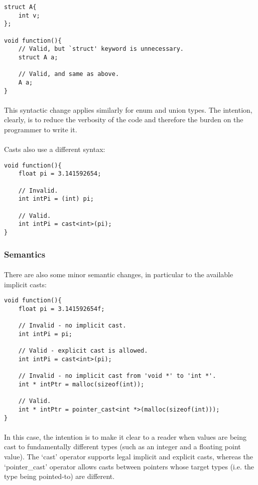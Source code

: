 \documentclass[12pt,twoside,notitlepage]{report}
\begin{document}
\begin{lstlisting}
struct A{
	int v;
};

void function(){
	// Valid, but `struct' keyword is unnecessary.
	struct A a;
	
	// Valid, and same as above.
	A a;
}
\end{lstlisting}

\paragraph{}
This syntactic change applies similarly for enum and union types. The intention, clearly, is to reduce the verbosity of the code and therefore the burden on the programmer to write it.

\paragraph{}
Casts also use a different syntax:


\begin{lstlisting}
void function(){
	float pi = 3.141592654;
	
	// Invalid.
	int intPi = (int) pi;
	
	// Valid.
	int intPi = cast<int>(pi);
}
\end{lstlisting}


\subsubsection{Semantics}

\paragraph{}
There are also some minor semantic changes, in particular to the available implicit casts:


\begin{lstlisting}
void function(){
	float pi = 3.141592654f;
	
	// Invalid - no implicit cast.
	int intPi = pi;
	
	// Valid - explicit cast is allowed.
	int intPi = cast<int>(pi);
	
	// Invalid - no implicit cast from 'void *' to 'int *'.
	int * intPtr = malloc(sizeof(int));
	
	// Valid.
	int * intPtr = pointer_cast<int *>(malloc(sizeof(int)));
}
\end{lstlisting}


\paragraph{}
In this case, the intention is to make it clear to a reader when values are being cast to fundamentally different types (such as an integer and a floating point value). The `cast' operator supports legal implicit and explicit casts, whereas the `pointer\_cast' operator allows casts between pointers whose target types (i.e. the type being pointed-to) are different.
\end{document}
